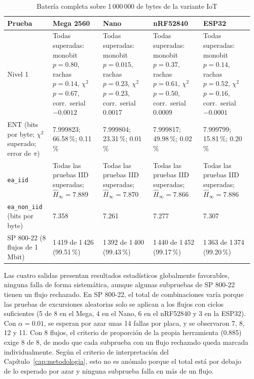 \begin{table}[H]
\centering
\caption{Batería completa sobre 1\,000\,000 de bytes de la variante IoT}
\label{tab:res_iot_1mb}
\footnotesize
\begin{tabularx}{\textwidth}{@{}L{0.16\textwidth}YYYY@{}}
\toprule
\textbf{Prueba} & \textbf{Mega 2560} & \textbf{Nano} & \textbf{nRF52840} & \textbf{ESP32} \\
\midrule
Nivel 1 & Todas superadas: monobit $p = 0.80$, rachas $p = 0.14$, $\chi^2$ $p = 0.67$, corr.\ serial $-0.0012$ & Todas superadas: monobit $p = 0.015$, rachas $p = 0.23$, $\chi^2$ $p = 0.23$, corr.\ serial 0.0017 & Todas superadas: monobit $p = 0.37$, rachas $p = 0.61$, $\chi^2$ $p = 0.50$, corr.\ serial 0.0009 & Todas superadas: monobit $p = 0.14$, rachas $p = 0.52$, $\chi^2$ $p = 0.16$, corr.\ serial $-0.0001$ \\
ENT (bits por byte; $\chi^2$ superado; error de $\pi$) & 7.999823; 66.58\,\%; 0.11\,\% & 7.999804; 23.31\,\%; 0.01\,\% & 7.999817; 49.98\,\%; 0.02\,\% & 7.999799; 15.81\,\%; 0.20\,\% \\
\texttt{ea\_iid} & Todas las pruebas IID superadas; $\hat{H}_\infty = 7.889$ & Todas las pruebas IID superadas; $\hat{H}_\infty = 7.870$ & Todas las pruebas IID superadas; $\hat{H}_\infty = 7.866$ & Todas las pruebas IID superadas; $\hat{H}_\infty = 7.886$ \\
\texttt{ea\_non\_iid} (bits por byte) & 7.358 & 7.261 & 7.277 & 7.307 \\
SP 800-22 (8 flujos de 1 Mbit) & 1\,419 de 1\,426 (99.51\,\%) & 1\,392 de 1\,400 (99.43\,\%) & 1\,440 de 1\,452 (99.17\,\%) & 1\,363 de 1\,374 (99.20\,\%) \\
\bottomrule
\end{tabularx}
\end{table}

Las cuatro salidas presentan resultados estadísticos globalmente favorables, ninguna falla de forma sistemática, aunque algunas subpruebas de SP 800-22 tienen un flujo rechazado. En SP 800-22, el total de combinaciones varía porque las pruebas de excursiones aleatorias solo se aplican a los flujos con ciclos suficientes (5 de 8 en el Mega, 4 en el Nano, 6 en el nRF52840 y 3 en la ESP32). Con $\alpha = 0.01$, se esperan por azar unas 14 fallas por placa, y se observaron 7, 8, 12 y 11. Con 8 flujos, el criterio de proporción de la propia herramienta (0.885) exige 8 de 8, de modo que cada subprueba con un flujo rechazado queda marcada individualmente. Según el criterio de interpretación del Capítulo~\ref{cap:metodologia}, esto no es anómalo porque el total está por debajo de lo esperado por azar y ninguna subprueba falla en más de un flujo.


